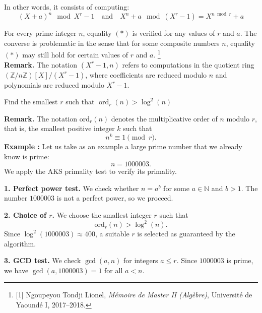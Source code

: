 In other words, it consists of computing:
\[
(X + a)^n \mod X^r - 1
\quad \text{and} \quad
X^n + a \mod (X^r - 1) = X^{n \bmod r} + a
\]

For every prime integer $n$, equality $(*)$ is verified for any values of $r$ and $a$. The converse is problematic in the sense that for some composite numbers $n$, equality $(*)$ may still hold for certain values of $r$ and $a$.
\footnote{[1] Ngoupeyou Tondji Lionel, \textit{Mémoire de Master II (Algèbre)}, Université de Yaoundé I, 2017--2018.}  
\\\textbf{Remark.} The notation $(X^r - 1, n)$ refers to computations in the quotient ring $(\mathbb{Z}/n\mathbb{Z})[X] / (X^r - 1)$, where coefficients are reduced modulo $n$ and polynomials are reduced modulo $X^r - 1$.
\begin{algorithm}[H]
\caption{AKS Primality Test}


Find the smallest $r$ such that $\operatorname{ord}_r(n) > \log^2(n)$\;




\end{algorithm}
\textbf{Remark.} The notation $\mathrm{ord}_r(n)$ denotes the multiplicative order of $n$ modulo $r$, that is, the smallest positive integer $k$ such that
\[
n^k \equiv 1 \pmod{r}.
\]
\textbf{Example :} Let us take as an example a large prime number that we already know is prime:
\[
n = 1000003.
\]
We apply the AKS primality test to verify its primality.

\textbf{1. Perfect power test.} We check whether $n = a^b$ for some $a \in \mathbb{N}$ and $b > 1$.  
The number $1000003$ is not a perfect power, so we proceed.

\textbf{2. Choice of $r$.} We choose the smallest integer $r$ such that
\[
\mathrm{ord}_r(n) > \log^2(n).
\]
Since $\log^2(1000003) \approx 400$, a suitable $r$ is selected as guaranteed by the algorithm.

\textbf{3. GCD test.} We check $\gcd(a,n)$ for integers $a \le r$.  
Since $1000003$ is prime, we have $\gcd(a,1000003)=1$ for all $a<n$.

